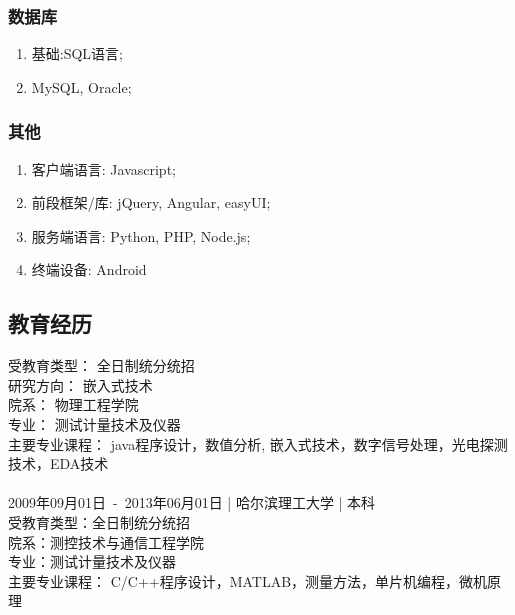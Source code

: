 \documentclass[12pt]{ctexart}
\begin{document}
\subsubsection{数据库}
\label{sec-1-2-3}
\begin{enumerate}
\item 基础:SQL语言;
\item MySQL, Oracle;
\end{enumerate}
\subsubsection{其他}
\label{sec-1-2-4}
\begin{enumerate}
\item 客户端语言: Javascript;
\item 前段框架/库: jQuery, Angular, easyUI;
\item 服务端语言: Python, PHP, Node.js;
\item 终端设备: Android
\end{enumerate}
\subsection{教育经历}
\label{sec-1-3}
受教育类型： 全日制统分统招\\
研究方向： 嵌入式技术\\
院系： 物理工程学院\\
专业： 测试计量技术及仪器\\
主要专业课程： java程序设计，数值分析, 嵌入式技术，数字信号处理，光电探测技术，EDA技术\\
\\
2009年09月01日\ -\ 2013年06月01日 | 哈尔滨理工大学 | 本科\\
受教育类型：全日制统分统招\\
院系：测控技术与通信工程学院\\
专业：测试计量技术及仪器\\
主要专业课程： C/C++程序设计，MATLAB，测量方法，单片机编程，微机原理\\
\end{document}
